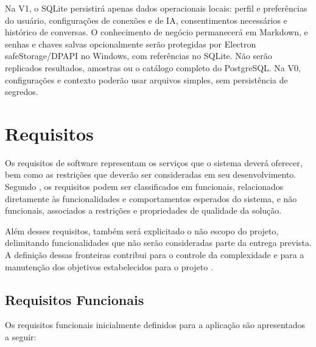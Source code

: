 Na V1, o SQLite persistirá apenas dados operacionais locais: perfil e preferências do usuário, configurações de conexões e de IA, consentimentos necessários e histórico de conversas. O conhecimento de negócio permanecerá em Markdown, e senhas e chaves salvas opcionalmente serão protegidas por Electron safeStorage/DPAPI no Windows, com referências no SQLite. Não serão replicados resultados, amostras ou o catálogo completo do PostgreSQL. Na V0, configurações e contexto poderão usar arquivos simples, sem persistência de segredos.


\section{Requisitos}
\label{sec:requisitos}

Os requisitos de software representam os serviços que o sistema deverá oferecer, bem como as restrições que deverão ser consideradas em seu desenvolvimento. Segundo \cite{Sommerville,sommerville2007engenharia}, os requisitos podem ser classificados em funcionais, relacionados diretamente às funcionalidades e comportamentos esperados do sistema, e não funcionais, associados a restrições e propriedades de qualidade da solução.

Além desses requisitos, também será explicitado o não escopo do projeto, delimitando funcionalidades que não serão consideradas parte da entrega prevista. A definição dessas fronteiras contribui para o controle da complexidade e para a manutenção dos objetivos estabelecidos para o projeto \cite{Pressman}.


\subsection{Requisitos Funcionais}

Os requisitos funcionais inicialmente definidos para a aplicação são apresentados a seguir:

